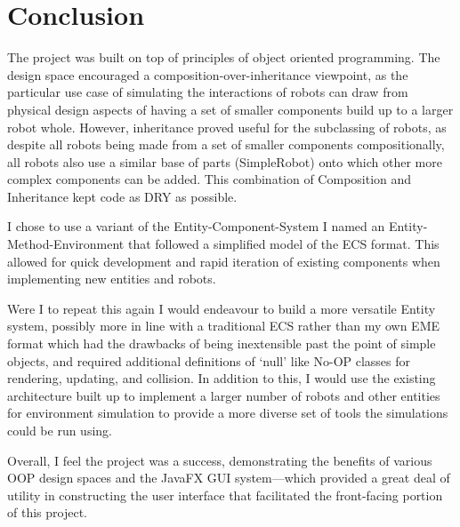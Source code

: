 \chapter{Conclusion}

The project was built on top of principles of object oriented programming. The design space encouraged a composition-over-inheritance viewpoint, as the particular use case of simulating the interactions of robots can draw from physical design aspects of having a set of smaller components build up to a larger robot whole. However, inheritance proved useful for the subclassing of robots, as despite all robots being made from a set of smaller components compositionally, all robots also use a similar base of parts (SimpleRobot) onto which other more complex components can be added. This combination of Composition and Inheritance kept code as DRY as possible.

I chose to use a variant of the Entity-Component-System I named an Entity-Method-Environment that followed a simplified model of the ECS format. This allowed for quick development and rapid iteration of existing components when implementing new entities and robots.

Were I to repeat this again I would endeavour to build a more versatile Entity system, possibly more in line with a traditional ECS rather than my own EME format which had the drawbacks of being inextensible past the point of simple objects, and required additional definitions of `null' like No-OP classes for rendering, updating, and collision. In addition to this, I would use the existing architecture built up to implement a larger number of robots and other entities for environment simulation to provide a more diverse set of tools the simulations could be run using.

Overall, I feel the project was a success, demonstrating the benefits of various OOP design spaces and the JavaFX GUI system---which provided a great deal of utility in constructing the user interface that facilitated the front-facing portion of this project.